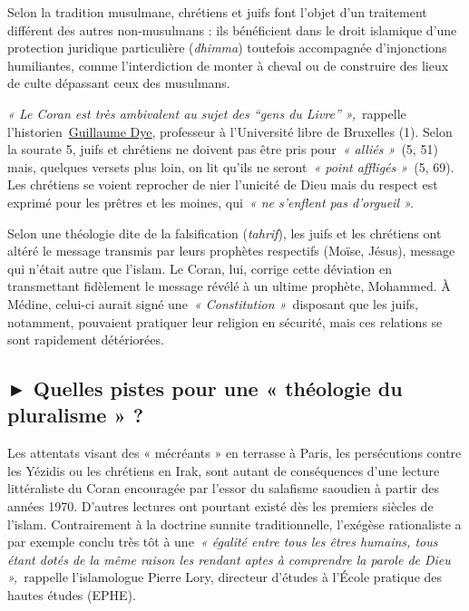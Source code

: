 Selon la tradition musulmane, chrétiens et juifs font l'objet d'un
traitement différent des autres non-musulmans : ils bénéficient dans le
droit islamique d'une protection juridique particulière (\emph{dhimma})
toutefois accompagnée d'injonctions humiliantes, comme l'interdiction de
monter à cheval ou de construire des lieux de culte dépassant ceux des
musulmans.
 

\emph{« Le Coran est très ambivalent au sujet des ``gens du Livre''
»,~}rappelle
l'historien~\href{https://www.la-croix.com/Culture/Livres-et-idees/historiens-decryptent-Coran-avant-lislam-2019-11-27-1201063090}{\underline{Guillaume
Dye}}, professeur à l'Université libre de Bruxelles (1). Selon la
sourate 5, juifs et chrétiens ne doivent pas être pris pour~\emph{«
alliés »~}(5, 51) mais, quelques versets plus loin, on lit qu'ils ne
seront~\emph{« point affligés »~}(5, 69). Les chrétiens se voient
reprocher de nier l'unicité de Dieu mais du respect est exprimé pour les
prêtres et les moines, qui~\emph{« ne s'enflent pas d'orgueil ».}

Selon une théologie dite de la falsification (\emph{tahrif}), les juifs
et les chrétiens ont altéré le message transmis par leurs prophètes
respectifs (Moïse, Jésus), message qui n'était autre que l'islam. Le
Coran, lui, corrige cette déviation en transmettant fidèlement le
message révélé à un ultime prophète, Mohammed. À Médine, celui-ci aurait
signé une~\emph{« Constitution »~}disposant que les juifs, notamment,
pouvaient pratiquer leur religion en sécurité, mais ces relations se
sont rapidement détériorées.

\subsection{► Quelles pistes pour une « théologie du pluralisme » ?}

Les attentats visant des « mécréants » en terrasse à Paris, les
persécutions contre les Yézidis ou les chrétiens en Irak, sont autant de
conséquences d'une lecture littéraliste du Coran encouragée par l'essor
du salafisme saoudien à partir des années 1970. D'autres lectures ont
pourtant existé dès les premiers siècles de l'islam. Contrairement à la
doctrine sunnite traditionnelle, l'exégèse rationaliste a par exemple
conclu très tôt à une~\emph{« égalité entre tous les êtres humains, tous
étant dotés de la même raison les rendant aptes à comprendre la parole
de Dieu »,~}rappelle l'islamologue Pierre Lory, directeur d'études à
l'École pratique des hautes études (EPHE).

